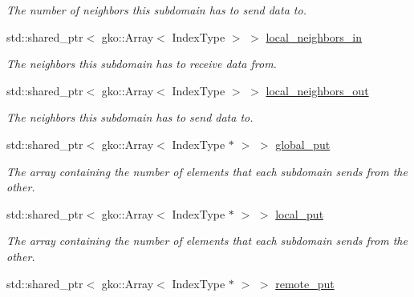 \begin{DoxyCompactItemize}
\begin{DoxyCompactList}\small\item\em The number of neighbors this subdomain has to send data to. \end{DoxyCompactList}\item 
\mbox{\label{structschwz_1_1Communicate_1_1comm__struct_a4e43434348a60554ecfdbd448fa54f73}} 
std\+::shared\+\_\+ptr$<$ gko\+::\+Array$<$ Index\+Type $>$ $>$ \hyperlink{structschwz_1_1Communicate_1_1comm__struct_a4e43434348a60554ecfdbd448fa54f73}{local\+\_\+neighbors\+\_\+in}
\begin{DoxyCompactList}\small\item\em The neighbors this subdomain has to receive data from. \end{DoxyCompactList}\item 
\mbox{\label{structschwz_1_1Communicate_1_1comm__struct_a087b62605d0889090c6e67325dfa3fb0}} 
std\+::shared\+\_\+ptr$<$ gko\+::\+Array$<$ Index\+Type $>$ $>$ \hyperlink{structschwz_1_1Communicate_1_1comm__struct_a087b62605d0889090c6e67325dfa3fb0}{local\+\_\+neighbors\+\_\+out}
\begin{DoxyCompactList}\small\item\em The neighbors this subdomain has to send data to. \end{DoxyCompactList}\item 
std\+::shared\+\_\+ptr$<$ gko\+::\+Array$<$ Index\+Type $\ast$ $>$ $>$ \hyperlink{structschwz_1_1Communicate_1_1comm__struct_a9186bd26e5826aa6ad88c863798593ac}{global\+\_\+put}
\begin{DoxyCompactList}\small\item\em The array containing the number of elements that each subdomain sends from the other. \end{DoxyCompactList}\item 
std\+::shared\+\_\+ptr$<$ gko\+::\+Array$<$ Index\+Type $\ast$ $>$ $>$ \hyperlink{structschwz_1_1Communicate_1_1comm__struct_ace7588b81dd2aa7a84e118df8137252b}{local\+\_\+put}
\begin{DoxyCompactList}\small\item\em The array containing the number of elements that each subdomain sends from the other. \end{DoxyCompactList}\item 
std\+::shared\+\_\+ptr$<$ gko\+::\+Array$<$ Index\+Type $\ast$ $>$ $>$ \hyperlink{structschwz_1_1Communicate_1_1comm__struct_a206d13b093699bf04bd1efb51c4290f2}{remote\+\_\+put}

\end{DoxyCompactItemize}

